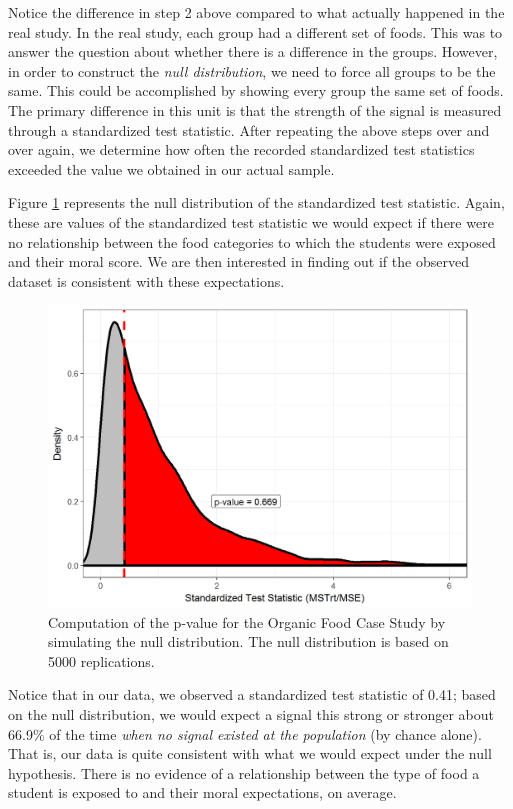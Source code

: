 \documentclass[]{book}
\theoremstyle{definition}
\theoremstyle{definition}
\theoremstyle{remark}
\begin{document}
Notice the difference in step 2 above compared to what actually happened
in the real study. In the real study, each group had a different set of
foods. This was to answer the question about whether there is a
difference in the groups. However, in order to construct the \emph{null
distribution}, we need to force all groups to be the same. This could be
accomplished by showing every group the same set of foods. The primary
difference in this unit is that the strength of the signal is measured
through a standardized test statistic. After repeating the above steps
over and over again, we determine how often the recorded standardized
test statistics exceeded the value we obtained in our actual sample.

Figure \ref{fig:anovateststat-pvalue} represents the null distribution
of the standardized test statistic. Again, these are values of the
standardized test statistic we would expect if there were no
relationship between the food categories to which the students were
exposed and their moral score. We are then interested in finding out if
the observed dataset is consistent with these expectations.

\begin{figure}

{\centering \includegraphics[width=0.8\linewidth]{./Images/anovateststat-pvalue-1} 

}

\caption{Computation of the p-value for the Organic Food Case Study by simulating the null distribution.  The null distribution is based on 5000 replications.}\label{fig:anovateststat-pvalue}
\end{figure}

Notice that in our data, we observed a standardized test statistic of
0.41; based on the null distribution, we would expect a signal this
strong or stronger about 66.9\% of the time \emph{when no signal existed
at the population} (by chance alone). That is, our data is quite
consistent with what we would expect under the null hypothesis. There is
no evidence of a relationship between the type of food a student is
exposed to and their moral expectations, on average.
\end{document}
